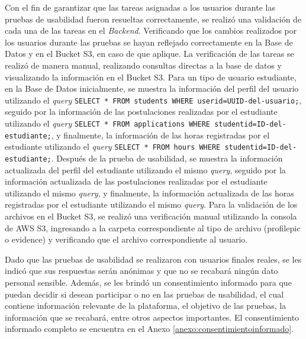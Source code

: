 Con el fin de garantizar que las tareas asignadas a los usuarios durante las pruebas de usabilidad fueron resueltas correctamente, se
realizó una validación de cada una de las tareas en el \textit{Backend}. Verificando que los cambios realizados por los usuarios durante
las pruebas se hayan reflejado correctamente en la Base de Datos y en el Bucket S3, en caso de que aplique. La verificación de las tareas
se realizó de manera manual, realizando consultas directas a la base de datos y visualizando la información en el Bucket S3.
Para un tipo de usuario estudiante, en la Base de Datos inicialmente, se muestra la información del perfil del usuario utilizando el \textit{query}
\texttt{SELECT * FROM students WHERE userid={UUID-del-usuario};}, seguido por la información de las postulaciones realizadas
por el estudiante utilizando el \textit{query} \texttt{SELECT * FROM applications WHERE studentid={ID-del-estudiante};}, y finalmente, la información de las horas
registradas por el estudiante utilizando el \textit{query} \texttt{SELECT * FROM hours WHERE studentid={ID-del-estudiante};}.
Después de la prueba de usabilidad, se muestra la información actualizada del perfil del estudiante utilizando el mismo \textit{query}, seguido
por la información actualizada de las postulaciones realizadas por el estudiante utilizando el mismo \textit{query}, y finalmente, la información
actualizada de las horas registradas por el estudiante utilizando el mismo \textit{query}.
Para la validación de los archivos en el Bucket S3, se realizó una verificación manual utilizando la consola de AWS S3, ingresando a la carpeta
correspondiente al tipo de archivo (profilepic o evidence) y verificando que el archivo correspondiente al usuario.

Dado que las pruebas de usabilidad se realizaron con usuarios finales reales, se les indicó que sus respuestas serán anónimas y que no
se recabará ningún dato personal sensible. Además, se les brindó un consentimiento informado para que puedan decidir si desean participar
o no en las pruebas de usabilidad, el cual contiene información relevante de la plataforma, el objetivo de las pruebas, la información que
se recabará, entre otros aspectos importantes. El consentimiento informado completo se encuentra en el Anexo \ref{anexo:consentimientoinformado}.

